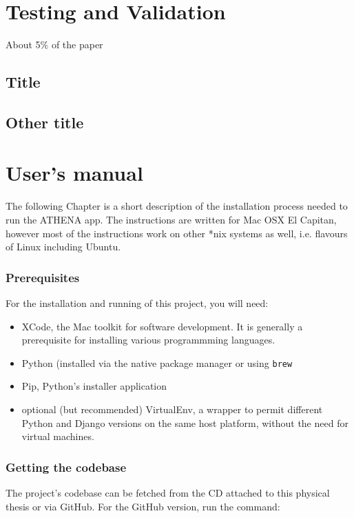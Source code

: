\documentclass[12pt,a4paper,twoside]{report}
\begin{document}
\newpage

\listoffigures
\tableofcontents
\newpage









\chapter{Testing and Validation}

About 5\% of the paper
\section{Title}
\section{Other title}

\chapter{User's manual}
The following Chapter is a short description of the installation process needed to run the ATHENA app. The instructions are written for Mac OSX El Capitan, however most of the instructions work on other *nix systems as well, i.e. flavours of Linux including Ubuntu.

\subsection*{Prerequisites}
For the installation and running of this project, you will need:

\begin{itemize}
\item XCode, the Mac toolkit for software development. It is generally a prerequisite for installing various programmming languages.
\item Python (installed via the native package manager or using \texttt{brew}
\item Pip, Python's installer application
\item optional (but recommended) VirtualEnv, a wrapper to permit different Python and Django versions on the same host platform, without the need for virtual machines.
\end{itemize}

\subsection*{Getting the codebase}
The project's codebase can be fetched from the CD attached to this physical thesis or via GitHub. For the GitHub version, run the command:
\end{document}
